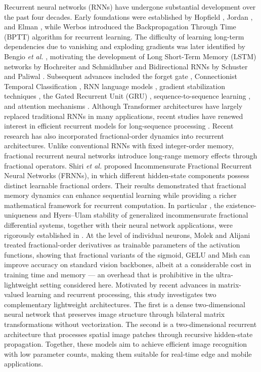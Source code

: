 \documentclass[pdflatex,sn-mathphys-num]{sn-jnl}%
\theoremstyle{thmstyleone}%
\theoremstyle{thmstyletwo}%
\theoremstyle{thmstylethree}%
\begin{document}
 Recurrent neural networks (RNNs) have undergone substantial development over the past four decades. Early foundations were established by Hopfield \cite{Hopfield1982}, Jordan \cite{Jordan1986}, and Elman \cite{Elman1990}, while Werbos \cite{Werbos1990} introduced the Backpropagation Through Time (BPTT) algorithm for recurrent learning. The difficulty of learning long-term dependencies due to vanishing and exploding gradients was later identified by Bengio \textit{et al.} \cite{Bengio1994}, motivating the development of Long Short-Term Memory (LSTM) networks by Hochreiter and Schmidhuber \cite{Hochreiter1997} and Bidirectional RNNs by Schuster and Paliwal \cite{Schuster1997}. Subsequent advances included the forget gate \cite{Gers2000}, Connectionist Temporal Classification \cite{Graves2006}, RNN language models \cite{Mikolov2010}, gradient stabilization techniques \cite{Pascanu2013}, the Gated Recurrent Unit (GRU) \cite{Cho2014GRU}, sequence-to-sequence learning \cite{Sutskever2014}, and attention mechanisms \cite{Bahdanau2014}. Although Transformer architectures \cite{Vaswani2017} have largely replaced traditional RNNs in many applications, recent studies have renewed interest in efficient recurrent models for long-sequence processing \cite{Feng2024}. Recent research has also incorporated fractional-order dynamics into recurrent architectures. Unlike conventional RNNs with fixed integer-order memory, fractional recurrent neural networks introduce long-range memory effects through fractional operators. Shiri \textit{et al.} \cite{Shiri2026FRNN} proposed Incommensurate Fractional Recurrent Neural Networks (FRNNs), in which different hidden-state components possess distinct learnable fractional orders. Their results demonstrated that fractional memory dynamics can enhance sequential learning while providing a richer mathematical framework for recurrent computation. 
In particular \cite{Shiri2026Math}, the existence-uniqueness and Hyers–Ulam stability of generalized incommensurate fractional differential systems, together with their neural network applications, were rigorously established in \cite{Shiri2026Math}.
At the level of individual neurons, Molek and Alijani \cite{Molek2025PRL} treated fractional-order derivatives as trainable parameters of the activation functions, showing that fractional variants of the sigmoid, GELU and Mish can improve accuracy on standard vision backbones, albeit at a considerable cost in training time and memory — an overhead that is prohibitive in the ultra-lightweight setting considered here.
Motivated by recent advances in matrix-valued learning and recurrent processing, this study investigates two complementary lightweight architectures. The first is a dense two-dimensional neural network that preserves image structure through bilateral matrix transformations without vectorization. The second is a two-dimensional recurrent architecture that processes spatial image patches through recursive hidden-state propagation. Together, these models aim to achieve efficient image recognition with low parameter counts, making them suitable for real-time edge and mobile applications. 
\end{document}

